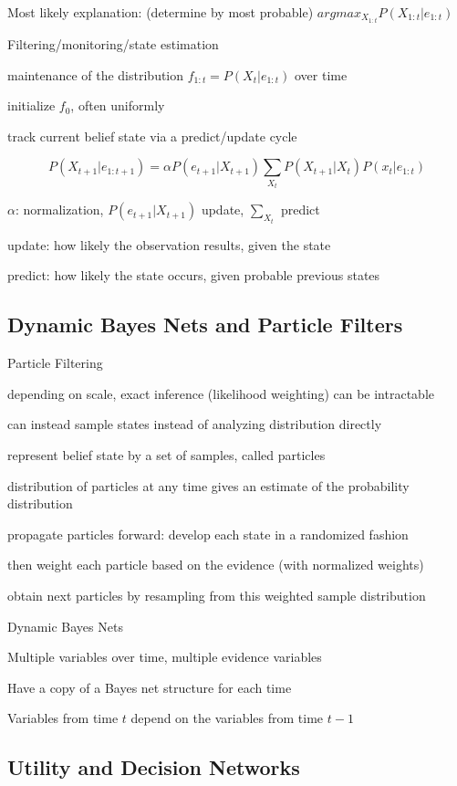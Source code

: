 \documentclass[12pt]{article}
\begin{document}
Most likely explanation: (determine by most probable) $arg max_{X_{1:t}}P(X_{1:t}|e_{1:t})$

\noindent
Filtering/monitoring/state estimation

maintenance of the distribution $f_{1:t} = P(X_t|e_{1:t})$ over time

initialize $f_0$, often uniformly

track current belief state via a predict/update cycle

$$P(X_{t+1}|e_{1:t+1}) = \alpha P(e_{t+1}|X_{t+1}) \sum_{X_t}P(X_{t+1}|X_t)P(x_t|e_{1:t})$$

$\alpha$: normalization, $P(e_{t+1}|X_{t+1})$ update, $\sum_{X_t}$ predict

update: how likely the observation results, given the state

predict: how likely the state occurs, given probable previous states

\subsection{Dynamic Bayes Nets and Particle Filters}

\noindent
Particle Filtering

depending on scale, exact inference (likelihood weighting) can be intractable

can instead sample states instead of analyzing distribution directly

represent belief state by a set of samples, called particles

distribution of particles at any time gives an estimate of the probability distribution

propagate particles forward: develop each state in a randomized fashion

then weight each particle based on the evidence (with normalized weights)

obtain next particles by resampling from this weighted sample distribution

\noindent
Dynamic Bayes Nets

Multiple variables over time, multiple evidence variables

Have a copy of a Bayes net structure for each time

Variables from time $t$ depend on the variables from time $t - 1$

\subsection{Utility and Decision Networks}
\end{document}
